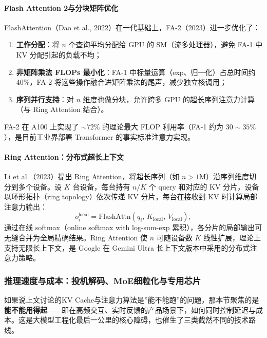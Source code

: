 \documentclass[12pt,a4paper]{article}
\begin{document}
\paragraph{Flash Attention 2与分块矩阵优化}

FlashAttention（Dao et al., 2022）在一代基础上，FA-2（2023）进一步优化了：
\begin{enumerate}
    \item \textbf{工作分配}：将 $n$ 个查询平均分配给 GPU 的 SM（流多处理器），避免 FA-1 中 KV 分配引起的负载不均；
    \item \textbf{非矩阵乘法 FLOPs 最小化}：FA-1 中标量运算（exp、归一化）占总时间约 40\%，FA-2 将这些操作融合进矩阵乘法的尾声，减少独立核调用；
    \item \textbf{序列并行支持}：对 $n$ 维度也做分块，允许跨多 GPU 的超长序列注意力计算（与 Ring Attention 结合）。
\end{enumerate}
FA-2 在 A100 上实现了 $\sim 72\%$ 的理论最大 FLOP 利用率（FA-1 约为 $30\sim35\%$），是目前工业界部署 Transformer 的事实标准注意力实现。

\paragraph{Ring Attention：分布式超长上下文}

Li et al.（2023）提出 Ring Attention，将超长序列（如 $n > 1$M）沿序列维度切分到多个设备。设 $K$ 台设备，每台持有 $n/K$ 个 query 和对应的 KV 分片，设备以环形拓扑（ring topology）依次传递 KV 分片，每台在接收到 KV 时计算局部注意力输出：
\begin{equation}
o_i^{\text{local}} = \text{FlashAttn}(q_i,\, K_{\text{local}},\, V_{\text{local}}),
\end{equation}
通过在线 softmax（online softmax with log-sum-exp 累积），各分片的局部输出可无缝合并为全局精确结果。Ring Attention 使 $n$ 可随设备数 $K$ 线性扩展，理论上支持无限长上下文，是 Google 在 Gemini Ultra 长上下文版本中采用的分布式注意力策略。

\subsubsection{推理速度与成本：投机解码、MoE细粒化与专用芯片}
\label{sec:inference-cost}

如果说上文讨论的KV Cache与注意力算法是”能不能跑”的问题，那本节聚焦的是\textbf{能不能用得起}——即在高频交互、实时反馈的产品场景下，如何同时控制延迟与成本。这是大模型工程化最后一公里的核心障碍，也催生了三类截然不同的技术路线。
\end{document}
